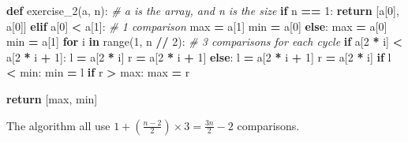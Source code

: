 \documentclass[
]{article}
\newenvironment{Shaded}{\begin{snugshade}}{\end{snugshade}}
\newcommand{\BuiltInTok}[1]{#1}
\newcommand{\CommentTok}[1]{\textcolor[rgb]{0.56,0.35,0.01}{\textit{#1}}}
\newcommand{\ControlFlowTok}[1]{\textcolor[rgb]{0.13,0.29,0.53}{\textbf{#1}}}
\newcommand{\DecValTok}[1]{\textcolor[rgb]{0.00,0.00,0.81}{#1}}
\newcommand{\KeywordTok}[1]{\textcolor[rgb]{0.13,0.29,0.53}{\textbf{#1}}}
\newcommand{\NormalTok}[1]{#1}
\newcommand{\OperatorTok}[1]{\textcolor[rgb]{0.81,0.36,0.00}{\textbf{#1}}}
\begin{document}
\begin{Shaded}
\begin{Highlighting}[]
\KeywordTok{def}\NormalTok{ exercise_2(a, n):  }\CommentTok{# a is the array, and n is the size}
    \ControlFlowTok{if}\NormalTok{ n }\OperatorTok{==} \DecValTok{1}\NormalTok{:}
        \ControlFlowTok{return}\NormalTok{ [a[}\DecValTok{0}\NormalTok{], a[}\DecValTok{0}\NormalTok{]]}
    \ControlFlowTok{elif}\NormalTok{ a[}\DecValTok{0}\NormalTok{] }\OperatorTok{<}\NormalTok{ a[}\DecValTok{1}\NormalTok{]:  }\CommentTok{# 1 comparison}
        \BuiltInTok{max} \OperatorTok{=}\NormalTok{ a[}\DecValTok{1}\NormalTok{]}
        \BuiltInTok{min} \OperatorTok{=}\NormalTok{ a[}\DecValTok{0}\NormalTok{]}
    \ControlFlowTok{else}\NormalTok{:}
        \BuiltInTok{max} \OperatorTok{=}\NormalTok{ a[}\DecValTok{0}\NormalTok{]}
        \BuiltInTok{min} \OperatorTok{=}\NormalTok{ a[}\DecValTok{1}\NormalTok{]}
    \ControlFlowTok{for}\NormalTok{ i }\KeywordTok{in} \BuiltInTok{range}\NormalTok{(}\DecValTok{1}\NormalTok{, n }\OperatorTok{//} \DecValTok{2}\NormalTok{):  }\CommentTok{# 3 comparisons for each cycle}
        \ControlFlowTok{if}\NormalTok{ a[}\DecValTok{2} \OperatorTok{*}\NormalTok{ i] }\OperatorTok{<}\NormalTok{ a[}\DecValTok{2} \OperatorTok{*}\NormalTok{ i }\OperatorTok{+} \DecValTok{1}\NormalTok{]:}
\NormalTok{            l }\OperatorTok{=}\NormalTok{ a[}\DecValTok{2} \OperatorTok{*}\NormalTok{ i]}
\NormalTok{            r }\OperatorTok{=}\NormalTok{ a[}\DecValTok{2} \OperatorTok{*}\NormalTok{ i }\OperatorTok{+} \DecValTok{1}\NormalTok{]}
        \ControlFlowTok{else}\NormalTok{:}
\NormalTok{            l }\OperatorTok{=}\NormalTok{ a[}\DecValTok{2} \OperatorTok{*}\NormalTok{ i }\OperatorTok{+} \DecValTok{1}\NormalTok{]}
\NormalTok{            r }\OperatorTok{=}\NormalTok{ a[}\DecValTok{2} \OperatorTok{*}\NormalTok{ i]}
        \ControlFlowTok{if}\NormalTok{ l }\OperatorTok{<} \BuiltInTok{min}\NormalTok{:}
            \BuiltInTok{min} \OperatorTok{=}\NormalTok{ l}
        \ControlFlowTok{if}\NormalTok{ r }\OperatorTok{>} \BuiltInTok{max}\NormalTok{:}
            \BuiltInTok{max} \OperatorTok{=}\NormalTok{ r}
  
    \ControlFlowTok{return}\NormalTok{ [}\BuiltInTok{max}\NormalTok{, }\BuiltInTok{min}\NormalTok{]}
  
\end{Highlighting}
\end{Shaded}

The algorithm all use \(1+(\frac{n-2}{2})\times 3=\frac{3n}{2}-2\)
comparisons.
\end{document}
